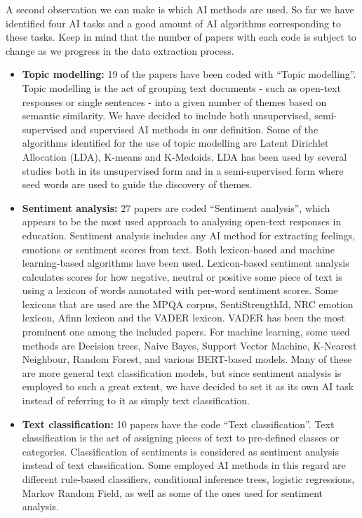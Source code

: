 A second observation we can make is which AI methods are used. So far we have identified four AI tasks and a good amount of AI algorithms corresponding to these tasks. Keep in mind that the number of papers with each code is subject to change as we progress in the data extraction process.
\begin{itemize}
    \item \textbf{Topic modelling:}
    19 of the papers have been coded with ``Topic modelling''. Topic modelling is the act of grouping text documents - such as open-text responses or single sentences - into a given number of themes based on semantic similarity. We have decided to include both unsupervised, semi-supervised and supervised AI methods in our definition. Some of the algorithms identified for the use of topic modelling are Latent Dirichlet Allocation (LDA), K-means and K-Medoids. LDA has been used by several studies both in its unsupervised form and in a semi-supervised form where seed words are used to guide the discovery of themes.
    \item \textbf{Sentiment analysis:}
    27 papers are coded ``Sentiment analysis'', which appears to be the most used approach to analysing open-text responses in education. Sentiment analysis includes any AI method for extracting feelings, emotions or sentiment scores from text. Both lexicon-based and machine learning-based algorithms have been used. Lexicon-based sentiment analysis calculates scores for how negative, neutral or positive some piece of text is using a lexicon of words annotated with per-word sentiment scores. Some lexicons that are used are the MPQA corpus, SentiStrengthId, NRC emotion lexicon, Afinn lexicon and the VADER lexicon. VADER has been the most prominent one among the included papers. For machine learning, some used methods are Decision trees, Naive Bayes, Support Vector Machine, K-Nearest Neighbour, Random Forest, and various BERT-based models. Many of these are more general text classification models, but since sentiment analysis is employed to such a great extent, we have decided to set it as its own AI task instead of referring to it as simply text classification.
    \item \textbf{Text classification:}
    10 papers have the code ``Text classification''. Text classification is the act of assigning pieces of text to pre-defined classes or categories. Classification of sentiments is considered as sentiment analysis instead of text classification. Some employed AI methods in this regard are different rule-based classifiers, conditional inference trees, logistic regressions, Markov Random Field, as well as some of the ones used for sentiment analysis.

\end{itemize}
